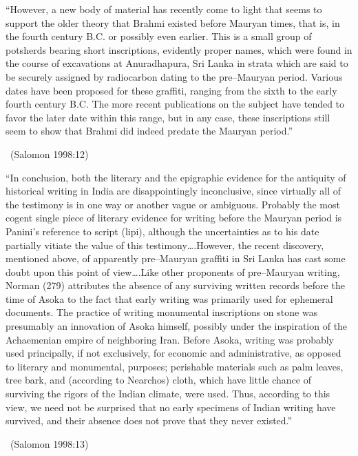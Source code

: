 \begin{myquote}
“However, a new body of material has recently come to light that seems to support the older theory that Brahmi existed before Mauryan times, that is, in the fourth century B.C. or possibly even earlier. This is a small group of potsherds bearing short inscriptions, evidently proper names, which were found in the course of excavations at Anuradhapura, Sri Lanka in strata which are said to be securely assigned by radiocarbon dating to the pre–Mauryan period. Various dates have been proposed for these graffiti, ranging from the sixth to the early fourth century B.C. The more recent publications on the subject have tended to favor the later date within this range, but in any case, these inscriptions still seem to show that Brahmi did indeed predate the Mauryan period.” 

~\hfill (Salomon 1998:12)
\end{myquote}

\begin{myquote}
“In conclusion, both the literary and the epigraphic evidence for the antiquity of historical writing in India are disappointingly inconclusive, since virtually all of the testimony is in one way or another vague or ambiguous. Probably the most cogent single piece of literary evidence for writing before the Mauryan period is Panini’s reference to script (lipi), although the uncertainties as to his date partially vitiate the value of this testimony….However, the recent discovery, mentioned above, of apparently pre–Mauryan graffiti in Sri Lanka has cast some doubt upon this point of view….Like other proponents of pre–Mauryan writing, Norman (279) attributes the absence of any surviving written records before the time of Asoka to the fact that early writing was primarily used for ephemeral documents. The practice of writing monumental inscriptions on stone was presumably an innovation of Asoka himself, possibly under the inspiration of the Achaemenian empire of neighboring Iran. Before Asoka, writing was probably used principally, if not exclusively, for economic and administrative, as opposed to literary and monumental, purposes; perishable materials such as palm leaves, tree bark, and (according to Nearchos) cloth, which have little chance of surviving the rigors of the Indian climate, were used. Thus, according to this view, we need not be surprised that no early specimens of Indian writing have survived, and their absence does not prove that they never existed.” 

~\hfill (Salomon 1998:13)
\end{myquote}

